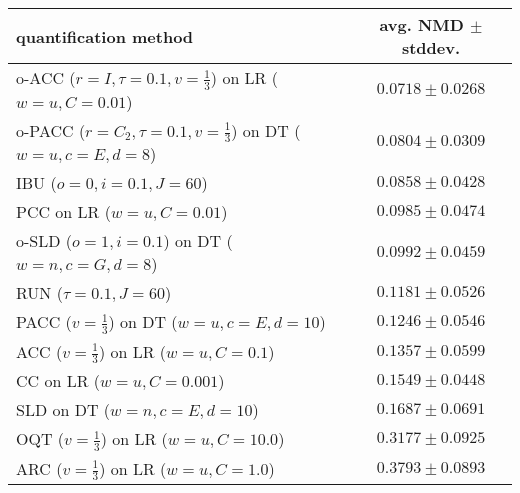 \begin{tabular}{lc}
  \toprule
  quantification method & avg. NMD $\pm$ stddev. \\
  \midrule
  o-ACC ($r=I, \tau=0.1, v=\frac{1}{3}$) on LR ($w=u, C=0.01$) & $\mathbf{0.0718 \pm 0.0268}$ \\
  o-PACC ($r=C_2, \tau=0.1, v=\frac{1}{3}$) on DT ($w=u, c=E, d=8$) & $0.0804 \pm 0.0309$ \\
  IBU ($o=0, i=0.1, J=60$) & $0.0858 \pm 0.0428$ \\
  PCC on LR ($w=u, C=0.01$) & $0.0985 \pm 0.0474$ \\
  o-SLD ($o=1, i=0.1$) on DT ($w=n, c=G, d=8$) & $0.0992 \pm 0.0459$ \\
  RUN ($\tau=0.1, J=60$) & $0.1181 \pm 0.0526$ \\
  PACC ($v=\frac{1}{3}$) on DT ($w=u, c=E, d=10$) & $0.1246 \pm 0.0546$ \\
  ACC ($v=\frac{1}{3}$) on LR ($w=u, C=0.1$) & $0.1357 \pm 0.0599$ \\
  CC on LR ($w=u, C=0.001$) & $0.1549 \pm 0.0448$ \\
  SLD on DT ($w=n, c=E, d=10$) & $0.1687 \pm 0.0691$ \\
  OQT ($v=\frac{1}{3}$) on LR ($w=u, C=10.0$) & $0.3177 \pm 0.0925$ \\
  ARC ($v=\frac{1}{3}$) on LR ($w=u, C=1.0$) & $0.3793 \pm 0.0893$ \\
  \bottomrule
\end{tabular}
